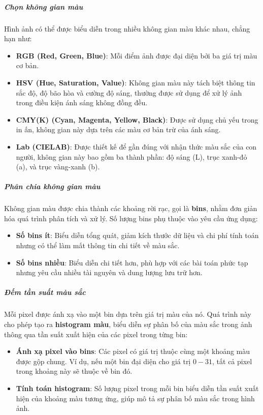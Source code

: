 \documentclass[a4paper,12pt]{article}
\begin{document}
\subparagraph{Chọn không gian màu}
\hspace{5mm}Hình ảnh có thể được biểu diễn trong nhiều không gian màu khác nhau, chẳng hạn như:
\begin{itemize}
    \item \textbf{RGB (Red, Green, Blue)}: Mỗi điểm ảnh được đại diện bởi ba giá trị màu cơ bản.
    \item \textbf{HSV (Hue, Saturation, Value)}: Không gian màu này tách biệt thông tin sắc độ, độ bão hòa và cường độ sáng, thường được sử dụng để xử lý ảnh trong điều kiện ánh sáng không đồng đều.
    \item \textbf{CMY(K) (Cyan, Magenta, Yellow, Black)}: Được sử dụng chủ yếu trong in ấn, không gian này dựa trên các màu cơ bản trừ của ánh sáng.
    \item \textbf{Lab (CIELAB)}: Được thiết kế để gần đúng với nhận thức màu sắc của con người, không gian này bao gồm ba thành phần: độ sáng (L), trục xanh-đỏ (a), và trục vàng-xanh (b).
\end{itemize}

\subparagraph{Phân chia không gian màu}  
\hspace{5mm}Không gian màu được chia thành các khoảng rời rạc, gọi là \textbf{bins}, nhằm đơn giản hóa quá trình phân tích và xử lý. Số lượng bins phụ thuộc vào yêu cầu ứng dụng:  
\begin{itemize}  
    \item \textbf{Số bins ít}: Biểu diễn tổng quát, giảm kích thước dữ liệu và chi phí tính toán nhưng có thể làm mất thông tin chi tiết về màu sắc.  
    \item \textbf{Số bins nhiều}: Biểu diễn chi tiết hơn, phù hợp với các bài toán phức tạp nhưng yêu cầu nhiều tài nguyên và dung lượng lưu trữ hơn.  
\end{itemize}  

\subparagraph{Đếm tần suất màu sắc}  
\hspace{5mm}Mỗi pixel được ánh xạ vào một bin dựa trên giá trị màu của nó. Quá trình này cho phép tạo ra \textbf{histogram màu}, biểu diễn sự phân bố của màu sắc trong ảnh thông qua tần suất xuất hiện của các pixel trong từng bin:  
\begin{itemize}  
    \item \textbf{Ánh xạ pixel vào bins}: Các pixel có giá trị thuộc cùng một khoảng màu được gộp chung. Ví dụ, nếu một bin đại diện cho giá trị \(0{-}31\), tất cả pixel trong khoảng này sẽ thuộc về bin đó.  
    \item \textbf{Tính toán histogram}: Số lượng pixel trong mỗi bin biểu diễn tần suất xuất hiện của khoảng màu tương ứng, giúp mô tả sự phân bố màu sắc trong hình ảnh.  
\end{itemize}  
\end{document}
